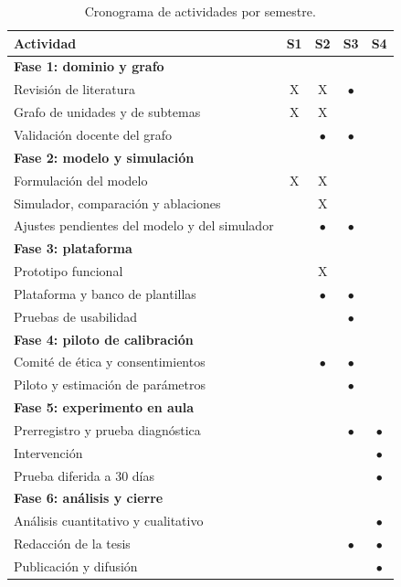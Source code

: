 \documentclass[12pt]{article}
\theoremstyle{definition}
\begin{document}
\begin{table}[H]
\centering\small
\caption{Cronograma de actividades por semestre.}
\label{tab:cronograma}
\begin{tabular}{@{}P{8.6cm}cccc@{}}
\toprule
\textbf{Actividad} & \textbf{S1} & \textbf{S2} & \textbf{S3} & \textbf{S4} \\
\midrule
\textbf{Fase 1: dominio y grafo} & & & & \\
\quad Revisión de literatura & X & X & $\bullet$ & \\
\quad Grafo de unidades y de subtemas & X & X & & \\
\quad Validación docente del grafo & & $\bullet$ & $\bullet$ & \\
\midrule
\textbf{Fase 2: modelo y simulación} & & & & \\
\quad Formulación del modelo & X & X & & \\
\quad Simulador, comparación y ablaciones & & X & & \\
\quad Ajustes pendientes del modelo y del simulador & & $\bullet$ & $\bullet$ & \\
\midrule
\textbf{Fase 3: plataforma} & & & & \\
\quad Prototipo funcional & & X & & \\
\quad Plataforma y banco de plantillas & & $\bullet$ & $\bullet$ & \\
\quad Pruebas de usabilidad & & & $\bullet$ & \\
\midrule
\textbf{Fase 4: piloto de calibración} & & & & \\
\quad Comité de ética y consentimientos & & $\bullet$ & $\bullet$ & \\
\quad Piloto y estimación de parámetros & & & $\bullet$ & \\
\midrule
\textbf{Fase 5: experimento en aula} & & & & \\
\quad Prerregistro y prueba diagnóstica & & & $\bullet$ & $\bullet$ \\
\quad Intervención & & & & $\bullet$ \\
\quad Prueba diferida a 30 días & & & & $\bullet$ \\
\midrule
\textbf{Fase 6: análisis y cierre} & & & & \\
\quad Análisis cuantitativo y cualitativo & & & & $\bullet$ \\
\quad Redacción de la tesis & & & $\bullet$ & $\bullet$ \\
\quad Publicación y difusión & & & & $\bullet$ \\
\bottomrule
\end{tabular}
\end{table}
\end{document}
